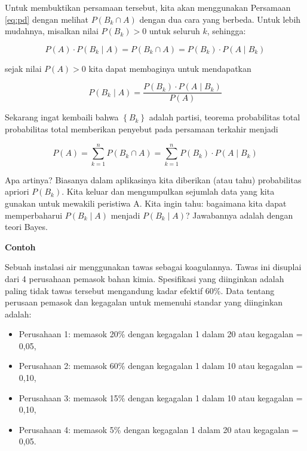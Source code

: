 \documentclass[]{book}
\providecommand{\tightlist}{%
  \setlength{\itemsep}{0pt}\setlength{\parskip}{0pt}}
\begin{document}
Untuk membuktikan persamaan tersebut, kita akan menggunakan Persamaan
\eqref{eq:pd} dengan melihat \(P\left(B_k\cap A\right)\) dengan dua cara
yang berbeda. Untuk lebih mudahnya, misalkan nilai
\(P\left(B_k\right)>0\) untuk seluruh \(k\), sehingga:

\begin{equation}
   P\left(A\right)\cdot P\left(B_k\mid A\right)=P\left(B_k\cap A\right)=P\left(B_k\right)\cdot P\left(A\mid B_k\right)
  \label{eq:tb2}
\end{equation}

sejak nilai \(P\left(A\right)>0\) kita dapat membaginya untuk
mendapatkan

\begin{equation}
   P\left(B_k\mid A\right)=\frac{P\left(B_k\right)\cdot P\left(A\mid B_k\right)}{P\left(A\right)}
  \label{eq:tb3}
\end{equation}

Sekarang ingat kembaili bahwa \(\left\{B_k\right\}\) adalah partisi,
teorema probabilitas total probabilitas total memberikan penyebut pada
persamaan terkahir menjadi

\begin{equation}
   P\left(A\right)=\sum_{k=1}^nP\left(B_k\cap A\right)=\sum_{k=1}^nP\left(B_k\right)\cdot P\left(A\mid B_k\right)
  \label{eq:tb4}
\end{equation}

Apa artinya? Biasanya dalam aplikasinya kita diberikan (atau tahu)
probabilitas apriori \(P\left(B_k\right)\). Kita keluar dan mengumpulkan
sejumlah data yang kita gunakan untuk mewakili peristiwa A. Kita ingin
tahu: bagaimana kita dapat memperbaharui \(P\left(B_k\mid A\right)\)
menjadi \(P\left(B_k\mid A\right)\)? Jawabannya adalah dengan teori
Bayes.

\textbf{Contoh}

Sebuah instalasi air menggunakan tawas sebagai koagulannya. Tawas ini
disuplai dari 4 perusahaan pemasok bahan kimia. Spesifikasi yang
diinginkan adalah paling tidak tawas tersebut mengandung kadar efektif
60\%. Data tentang perusaan pemasok dan kegagalan untuk memenuhi standar
yang diinginkan adalah:

\begin{itemize}
\tightlist
\item
  Perusahaan 1: memasok 20\% dengan kegagalan 1 dalam 20 atau kegagalan
  = 0,05,
\item
  Perusahaan 2: memasok 60\% dengan kegagalan 1 dalam 10 atau kegagalan
  = 0,10,
\item
  Perusahaan 3: memasok 15\% dengan kegagalan 1 dalam 10 atau kegagalan
  = 0,10,
\item
  Perusahaan 4: memasok 5\% dengan kegagalan 1 dalam 20 atau kegagalan =
  0,05.
\end{itemize}
\end{document}
